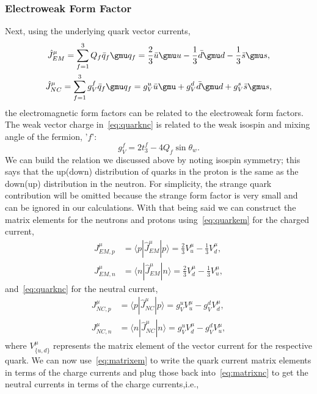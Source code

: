 \subsubsection{Electroweak Form Factor}
Next, using the underlying quark vector currents,
\begin{gather}
\hat{J}_{EM}^{\mu}= \sum _{f=1}^{3} Q_f \bar{q}_f \gmu q_f =\frac{2}{3}\bar{u}\gmu u -\frac{1}{3}\bar{d}\gmu d-\frac{1}{3}\bar{s}\gmu s, \label{eq:quarkem}  \\
\hat{J}_{NC}^{\mu}= \sum _{f=1}^{3} g_V^f \bar{q}_f \gmu q_f =g_V^u \bar{u}\gmu + g_V^d \bar{d}\gmu d + g_V^s\bar{s}\gmu s, \label{eq:quarknc}
\end{gather}
the electromagnetic form factors can be related to the electroweak form factors. The weak vector charge in~\eqref{eq:quarknc} is related to the weak isospin and mixing angle of the fermion, '$f$':
\begin{equation}
g_V^f= 2t_3^f - 4 Q_f \sin \theta _w.
\end{equation}  
We can build the relation we discussed above by noting isospin symmetry; this says that the up(down) distribution of quarks in the proton is the same as the down(up) distribution in the neutron. For simplicity, the strange quark contribution will be omitted because the strange form factor is very small and can be ignored in our calculations. With that being said we can construct the matrix elements for the neutrons and protons using~\eqref{eq:quarkem} for the charged current,
\begin{equation}\label{eq:matrixem}
\begin{aligned}
J^{\mu}_{EM,p} &= \langle p|\hat{J}^{\mu}_{EM}|p \rangle = \frac{2}{3} V_u^{\mu} - \frac{1}{3} V_d^{\mu},
\\    
J^{\mu}_{EM,n} &= \langle n|\hat{J}^{\mu}_{EM}|n \rangle = \frac{2}{3} V_d^{\mu} - \frac{1}{3} V_u^{\mu},
\end{aligned}
\end{equation}
and~\eqref{eq:quarknc} for the neutral current,
\begin{equation}\label{eq:matrixnc}
\begin{aligned}
J^{\mu}_{NC,p} &= \langle p|\hat{J}^{\mu}_{NC}|p \rangle = g_V^u V_u^{\mu} - g_V^d V_d^{\mu},
\\    
J^{\mu}_{NC,n} &= \langle n|\hat{J}^{\mu}_{NC}|n \rangle = g_V^u V_d^{\mu} - g_V^d V_u^{\mu},
\end{aligned}
\end{equation}
where $V_{\lbrace u,d \rbrace}^{\mu}$ represents the matrix element of the vector current for the respective quark. We can now use~\eqref{eq:matrixem} to write the quark current matrix elements in terms of the charge currents and plug those back into~\eqref{eq:matrixnc} to get the neutral currents in terms of the charge currents,i.e.,
